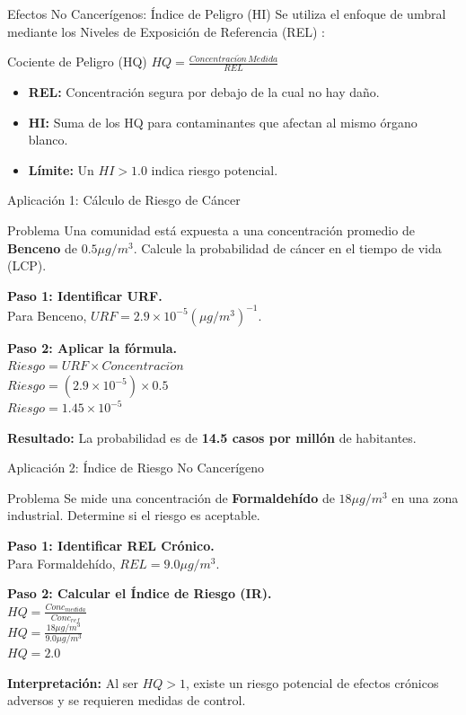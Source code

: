\documentclass[10pt,compress]{beamer}
\begin{document}
\begin{frame}{Efectos No Cancerígenos: Índice de Peligro (HI)}
    Se utiliza el enfoque de umbral mediante los Niveles de Exposición de Referencia (REL) :
    \begin{block}{Cociente de Peligro (HQ)}
        $HQ = \frac{Concentraci\acute{o}n \, Medida}{REL}$ 
    \end{block}
    \begin{itemize}
        \item \textbf{REL:} Concentración segura por debajo de la cual no hay daño.
        \item \textbf{HI:} Suma de los HQ para contaminantes que afectan al mismo órgano blanco.
        \item \textbf{Límite:} Un $HI > 1.0$ indica riesgo potencial.
    \end{itemize}
\end{frame}

\begin{frame}{Aplicación 1: Cálculo de Riesgo de Cáncer}
    \begin{block}{Problema}
        Una comunidad está expuesta a una concentración promedio de \textbf{Benceno} de $0.5 \mu g/m^3$. Calcule la probabilidad de cáncer en el tiempo de vida (LCP).
    \end{block}
    
    \textbf{Paso 1: Identificar URF.} \\
    Para Benceno, $URF = 2.9 \times 10^{-5} (\mu g/m^3)^{-1}$.
    
    \textbf{Paso 2: Aplicar la fórmula.} \\
    $Riesgo = URF \times Concentraci\acute{o}n$ \\
    $Riesgo = (2.9 \times 10^{-5}) \times 0.5$ \\
    $Riesgo = 1.45 \times 10^{-5}$
    
    \textbf{Resultado:} La probabilidad es de \textbf{14.5 casos por millón} de habitantes.
\end{frame}

\begin{frame}{Aplicación 2: Índice de Riesgo No Cancerígeno}
    \begin{block}{Problema}
        Se mide una concentración de \textbf{Formaldehído} de $18 \mu g/m^3$ en una zona industrial. Determine si el riesgo es aceptable.
    \end{block}
    
    \textbf{Paso 1: Identificar REL Crónico.} \\
    Para Formaldehído, $REL = 9.0 \mu g/m^3$.
    
    \textbf{Paso 2: Calcular el Índice de Riesgo (IR).} \\
    $HQ= \frac{Conc_{medida}}{Conc_{ref}}$ \\
    $HQ= \frac{18 \mu g/m^3}{9.0 \mu g/m^3}$ \\
    $HQ= 2.0$
    
    \textbf{Interpretación:} Al ser $HQ> 1$, existe un riesgo potencial de efectos crónicos adversos y se requieren medidas de control.
\end{frame}
\end{document}
